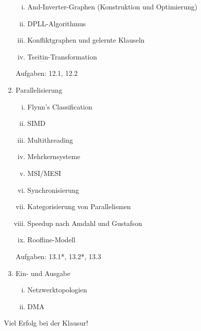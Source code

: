 \documentclass{article}
\begin{document}
\begin{enumerate}
          \begin{enumerate}[i.]
              \item And-Inverter-Graphen (Konstruktion und Optimierung)
              \item DPLL-Algorithmus
              \item Konfliktgraphen und gelernte Klauseln
              \item Tseitin-Transformation
          \end{enumerate}
          Aufgaben: 12.1, 12.2
    \item Parallelisierung
          \begin{enumerate}[i.]
              \item Flynn's Classification
              \item SIMD
              \item Multithreading
              \item Mehrkernsysteme
              \item MSI/MESI 
              \item Synchronisierung
              \item Kategorisierung von Parallelismen
              \item Speedup nach Amdahl und Gustafson
              \item Roofline-Modell
          \end{enumerate}
          Aufgaben: 13.1*, 13.2*, 13.3
    \item Ein- und Ausgabe
    \begin{enumerate}[i.]
        \item Netzwerktopologien
        \item DMA
    \end{enumerate}
\end{enumerate}
\vspace{3cm}
\begin{center}
\Large Viel Erfolg bei der Klausur!
\end{center}
\end{document}

